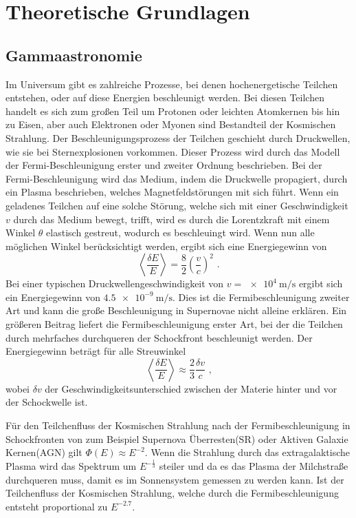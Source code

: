 \chapter{Theoretische Grundlagen}

\section{Gammaastronomie}
\label{sec:Gammaastronomie}

Im Universum gibt es zahlreiche Prozesse, bei denen hochenergetische Teilchen entstehen, oder auf diese Energien beschleunigt werden.
Bei diesen Teilchen handelt es sich zum großen Teil um Protonen oder leichten  Atomkernen bis hin zu Eisen, aber auch Elektronen oder Myonen
sind Bestandteil der Kosmischen Strahlung.
Der Beschleunigungsprozess der Teilchen geschieht durch Druckwellen, wie sie bei Sternexplosionen vorkommen.
Dieser Prozess wird durch das Modell der Fermi-Beschleunigung erster und zweiter Ordnung beschrieben.
Bei der Fermi-Beschleunigung wird das Medium, indem die Druckwelle propagiert, durch ein Plasma beschrieben, welches Magnetfeldstörungen mit sich führt.
Wenn ein geladenes Teilchen auf eine solche Störung, welche sich mit einer Geschwindigkeit $v$ durch das Medium bewegt, trifft, wird es durch die
Lorentzkraft mit einem Winkel $\theta$ elastisch gestreut, wodurch es beschleuingt wird.
Wenn nun alle möglichen Winkel berücksichtigt werden, ergibt sich eine Energiegewinn von
\begin{equation*}
  \left\langle \frac{\delta E}{E} \right\rangle = \frac{8}{2}\left(\frac{v}{c}\right)^2\text{ .}
\end{equation*}
Bei einer typischen Druckwellengeschwindigkeit von $v=\SI{e4}{\m\per\s}$\cite[14]{HESS} ergibt sich ein Energiegewinn von $\SI{4.5e-9}{\m\per\s}$.
Dies ist die Fermibeschleunigung zweiter Art und kann die große Beschleunigung in Supernovae nicht alleine erklären.
Ein größeren Beitrag liefert die Fermibeschleunigung erster Art, bei der die Teilchen durch mehrfaches durchqueren der Schockfront beschleunigt werden.
Der Energiegewinn beträgt für alle Streuwinkel
\begin{equation*}
  \left\langle \frac{\delta E}{E} \right\rangle \approx \frac{2}{3}\frac{\delta v}{c} \text{ ,}
\end{equation*}
wobei $\delta v$ der Geschwindigkeitsunterschied zwischen der Materie hinter und vor der Schockwelle ist.

Für den Teilchenfluss der Kosmischen Strahlung nach der Fermibeschleunigung in Schockfronten von zum Beispiel Supernova Überresten(SR) oder Aktiven
Galaxie Kernen(AGN) gilt $\Phi(E)\approx E^{-2}$. Wenn die Strahlung durch das extragalaktische Plasma wird das Spektrum um $E^{-\frac{1}{3}}$ steiler und
da es das Plasma der Milchstraße durchqueren muss, damit es im Sonnensystem gemessen zu werden kann. Ist der Teilchenfluss der Kosmischen Strahlung, welche
durch die Fermibeschleunigung entsteht proportional zu $E^{-2.7}$\cite[5]{Cosmic_rays}.

